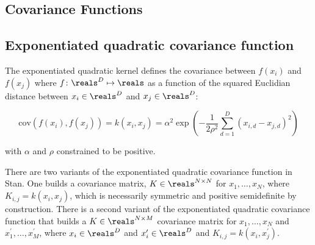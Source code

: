 \begin{description}
\begin{description}
\begin{description}
\begin{description}
\begin{description}
\begin{description}
\begin{description}
\begin{description}
\begin{description}
\begin{description}
\begin{description}
\begin{description}
\begin{description}
\begin{description}
\begin{description}
\begin{description}
\begin{description}
\begin{description}
\begin{description}
\begin{description}
\begin{description}
\begin{description}
\begin{description}
\begin{description}
\begin{description}
\begin{description}
\begin{description}
\begin{description}
\begin{description}
\begin{description}
\begin{description}
\begin{description}
\begin{description}
\begin{description}
\begin{description}
\begin{description}
\begin{description}
\begin{description}
\begin{description}
\begin{description}
\begin{description}
\begin{description}
\begin{description}
\begin{description}
\begin{description}
\begin{description}
\begin{description}
\begin{description}
\begin{description}
\begin{description}
\begin{description}
\begin{description}
\begin{description}
\begin{description}
\begin{description}
\begin{description}
\begin{description}
\begin{description}
\begin{description}
\begin{description}

\section{Covariance Functions}

\subsection{Exponentiated quadratic covariance function}

The exponentiated quadratic kernel defines the covariance between $f(x_i)$ and $f(x_j)$ where $f\colon \reals^D \mapsto \reals$ as a function of the squared Euclidian distance between $x_i \in \reals^D$ and $x_j \in \reals^D$:

\[   \text{cov}(f(x_i), f(x_j)) = k(x_i, x_j) = \alpha^2 \exp \left( 	- \dfrac{1}{2\rho^2} \sum_{d=1}^D (x_{i,d} - x_{j,d})^2 \right) \]

with $\alpha$ and $\rho$ constrained to be positive.

There are two variants of the exponentiated quadratic covariance function in Stan. One builds a covariance matrix, $K \in \reals^{N \times N}$ for $x_1, \dots, x_N$, where $K_{i,j} = k(x_i, x_j)$, which is necessarily symmetric and positive semidefinite by construction. There is a second variant of the exponentiated quadratic covariance function that builds a $K \in \reals^{N \times M}$ covariance matrix for $x_1, \dots, x_N$ and $x^\prime_1, \dots, x^\prime_M$, where $x_i \in \reals^D$ and $x^\prime_i \in \reals^D$ and $K_{i,j} = k(x_i, x^\prime_j)$.

\begin{description} %
\end{description}
\end{description}
\end{description}
\end{description}
\end{description}
\end{description}
\end{description}
\end{description}
\end{description}
\end{description}
\end{description}
\end{description}
\end{description}
\end{description}
\end{description}
\end{description}
\end{description}
\end{description}
\end{description}
\end{description}
\end{description}
\end{description}
\end{description}
\end{description}
\end{description}
\end{description}
\end{description}
\end{description}
\end{description}
\end{description}
\end{description}
\end{description}
\end{description}
\end{description}
\end{description}
\end{description}
\end{description}
\end{description}
\end{description}
\end{description}
\end{description}
\end{description}
\end{description}
\end{description}
\end{description}
\end{description}
\end{description}
\end{description}
\end{description}
\end{description}
\end{description}
\end{description}
\end{description}
\end{description}
\end{description}
\end{description}
\end{description}
\end{description}
\end{description}
\end{description}
\end{description}
